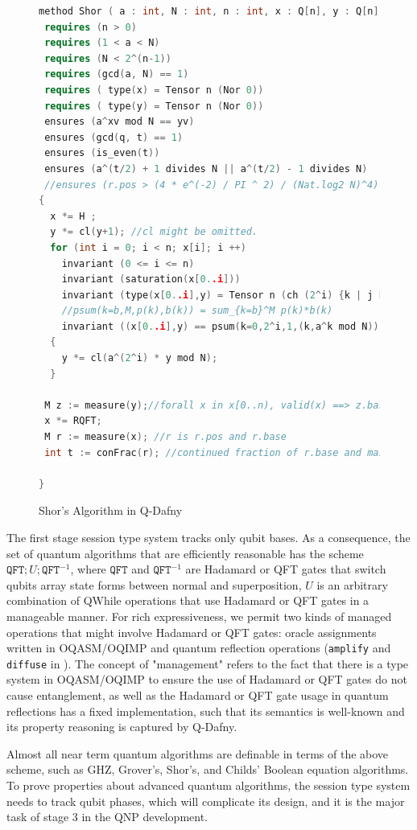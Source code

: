 \begin{figure}[t]
{\small
  \begin{lstlisting}[language=C++,xleftmargin=4 mm]
method Shor ( a : int, N : int, n : int, x : Q[n], y : Q[n] )
 requires (n > 0)
 requires (1 < a < N)
 requires (N < 2^(n-1))
 requires (gcd(a, N) == 1)
 requires ( type(x) = Tensor n (Nor 0))
 requires ( type(y) = Tensor n (Nor 0))
 ensures (a^xv mod N == yv)
 ensures (gcd(q, t) == 1)
 ensures (is_even(t))
 ensures (a^(t/2) + 1 divides N || a^(t/2) - 1 divides N)
 //ensures (r.pos > (4 * e^(-2) / PI ^ 2) / (Nat.log2 N)^4)
{
  x *= H ;
  y *= cl(y+1); //cl might be omitted.
  for (int i = 0; i < n; x[i]; i ++)
    invariant (0 <= i <= n)
    invariant (saturation(x[0..i]))
    invariant (type(x[0..i],y) = Tensor n (ch (2^i) {k | j baseof x[0..i] && k = (j,a^j mod N)}))
    //psum(k=b,M,p(k),b(k)) = sum_{k=b}^M p(k)*b(k)
    invariant ((x[0..i],y) == psum(k=0,2^i,1,(k,a^k mod N))) 
  {
    y *= cl(a^(2^i) * y mod N);
  }

 M z := measure(y);//forall x in x[0..n), valid(x) ==> z.base = a^(x.base) mod N
 x *= RQFT;
 M r := measure(x); //r is r.pos and r.base
 int t := conFrac(r); //continued fraction of r.base and maintain r.pos (probability)
 
}
  \end{lstlisting}
}
\caption{Shor's Algorithm in Q-Dafny}
\label{fig:shorexample}
\end{figure}


The first stage session type system tracks only qubit bases.
As a consequence, the set of quantum algorithms that are efficiently reasonable has the scheme $\texttt{QFT};U;\texttt{QFT}^{-1}$,
where $\texttt{QFT}$ and $\texttt{QFT}^{-1}$ are Hadamard or QFT gates that switch qubits array state forms between normal and superposition, $U$ is an arbitrary combination of QWhile operations that use Hadamard or QFT gates in a manageable manner.
For rich expressiveness, we permit two kinds of managed operations that might involve Hadamard or QFT gates: 
oracle assignments written in OQASM/OQIMP and quantum reflection operations (\texttt{amplify} and \texttt{diffuse} in ).
The concept of "management" refers to the fact that there is a type system in OQASM/OQIMP to ensure the use of Hadamard or QFT gates do not cause entanglement, as well as the Hadamard or QFT gate usage in quantum reflections has a fixed implementation, such that its semantics is well-known and its property reasoning is captured by Q-Dafny.

Almost all near term quantum algorithms are definable in terms of the above scheme, such as GHZ, Grover's, Shor's, and Childs' Boolean equation algorithms.
To prove properties about advanced quantum algorithms, the session type system needs to track qubit phases, which will complicate its design, and it is the major task of stage 3 in the QNP development.


















